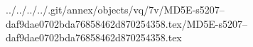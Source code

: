 ../../../../.git/annex/objects/vq/7v/MD5E-s5207--daf9dae0702bda76858462d870254358.tex/MD5E-s5207--daf9dae0702bda76858462d870254358.tex